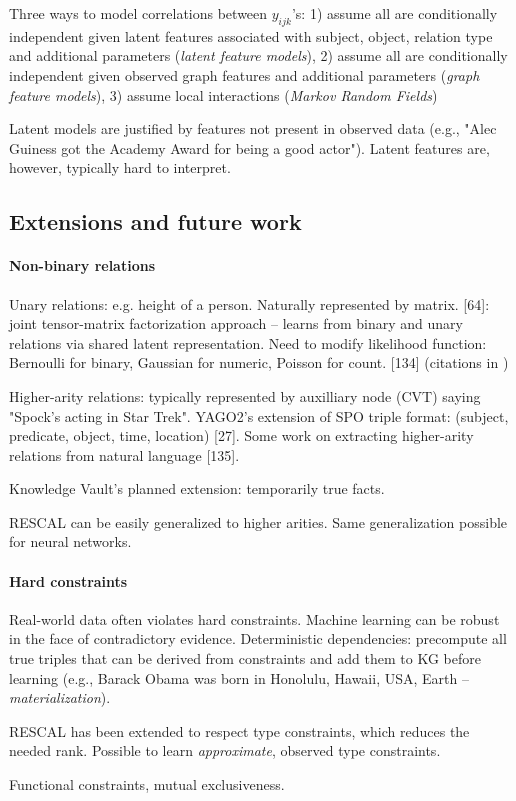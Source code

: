 Three ways to model correlations between $y_{ijk}$'s: 1) assume all are
conditionally independent given latent features associated with subject, object,
relation type and additional parameters (\textit{latent feature models}), 2)
assume all are conditionally independent given observed graph features and
additional parameters (\textit{graph feature models}), 3) assume local
interactions (\textit{Markov Random Fields})

Latent models are justified by features not present in observed data (e.g.,
"Alec Guiness got the Academy Award for being a good actor"). Latent features
are, however, typically hard to interpret.

\subsection{Extensions and future work}

\paragraph{Non-binary relations}

Unary relations: e.g. height of a person. Naturally represented by matrix.
[64]: joint tensor-matrix factorization approach -- learns from binary and unary
relations via shared latent representation. Need to modify likelihood function:
Bernoulli for binary, Gaussian for numeric, Poisson for count. [134]
(citations in \cite{review-of-relational-ml-for-kgs})

Higher-arity relations: typically represented by auxilliary node (CVT) saying
"Spock's acting in Star Trek".
YAGO2's extension of SPO triple format: (subject, predicate, object, time,
location) [27]. Some work on extracting higher-arity relations from natural
language [135].

Knowledge Vault's planned extension: temporarily true facts.

RESCAL can be easily generalized to higher arities. Same generalization possible
for neural networks.

\paragraph{Hard constraints}

Real-world data often violates hard constraints. Machine learning can be robust
in the face of contradictory evidence.
Deterministic dependencies: precompute all true triples that can be derived from
constraints and add them to KG before learning (e.g., Barack Obama was born in
Honolulu, Hawaii, USA, Earth -- \textit{materialization}).

RESCAL has been extended to respect type constraints, which reduces the needed
rank.
Possible to learn \textit{approximate}, observed type constraints.

Functional constraints, mutual exclusiveness.


